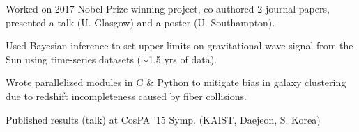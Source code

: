\documentclass[]{deedy-resume-openfont}
\begin{document}
\begin{minipage}[t]{0.66\textwidth}
 \hfill {}

\begin{tightemize}
\item Worked on 2017 Nobel Prize-winning project, co-authored 2 journal papers, presented a talk (U. Glasgow) and a poster (U. Southampton).\item Used Bayesian inference to set upper limits on gravitational wave signal from the Sun using time-series datasets ($\sim$1.5 yrs of data). \end{tightemize}
\sectionsep

\sectionsep
\sectionsep

 \hfill  {}


\begin{tightemize}
\item Wrote parallelized modules in C \& Python to mitigate bias in galaxy clustering due to redshift incompleteness caused by fiber collisions. \item Published results (talk) at CosPA '15 Symp. (KAIST, Daejeon, S. Korea) \end{tightemize}
\sectionsep
\end{minipage} 


\end{document}
